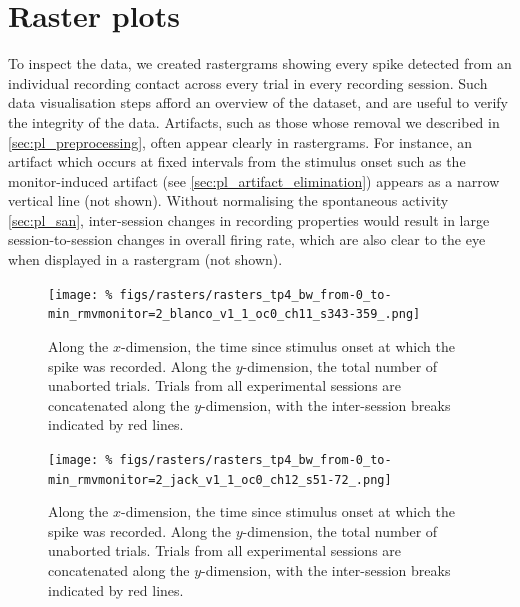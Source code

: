 \FloatBarrier
\section{Raster plots}
\label{sec:pl_rasters}

To inspect the data, we created rastergrams showing every spike detected from an individual recording contact across every trial in every recording session.
Such data visualisation steps afford an overview of the dataset, and are useful to verify the integrity of the data.
Artifacts, such as those whose removal we described in \autoref{sec:pl_preprocessing}, often appear clearly in rastergrams.
For instance, an artifact which occurs at fixed intervals from the stimulus onset such as the monitor-induced artifact (see \autoref{sec:pl_artifact_elimination}) appears as a narrow vertical line (not shown).
Without normalising the spontaneous activity \autoref{sec:pl_san}, inter-session changes in recording properties would result in large session-to-session changes in overall firing rate, which are also clear to the eye when displayed in a rastergram (not shown).


\begin{figure}[p]
    \centerline{
    \texttt{[image: \%
figs/rasters/rasters\_tp4\_bw\_from-0\_to-min\_rmvmonitor=2\_blanco\_v1\_1\_oc0\_ch11\_s343-359\_.png]}
}
    \caption{
    Along the $x$-dimension, the time since stimulus onset at which the spike was recorded.
    Along the $y$-dimension, the total number of unaborted trials.
    Trials from all experimental sessions are concatenated along the $y$-dimension, with the inter-session breaks indicated by red lines.
}
    \label{fig:raster_blanco_v1}
\end{figure}


\begin{figure}[p]
    \centerline{
    \texttt{[image: \%
figs/rasters/rasters\_tp4\_bw\_from-0\_to-min\_rmvmonitor=2\_jack\_v1\_1\_oc0\_ch12\_s51-72\_.png]}
}
    \caption{
    Along the $x$-dimension, the time since stimulus onset at which the spike was recorded.
    Along the $y$-dimension, the total number of unaborted trials.
    Trials from all experimental sessions are concatenated along the $y$-dimension, with the inter-session breaks indicated by red lines.
}
    \label{fig:raster_jack_v1}
\end{figure}


